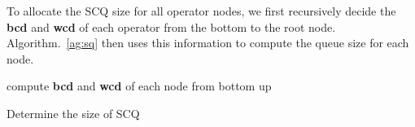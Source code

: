 To allocate the SCQ size for all operator nodes, we first recursively decide the \textbf{bcd} and \textbf{wcd} of each operator from the bottom to the root node. Algorithm.~\ref{ag:sq} then uses this information to compute the queue size for each node.\par


\begin{algorithm}
    \SetAlgoLined
    
    compute \textbf{bcd} and \textbf{wcd} of each node from bottom up\;
    
    
     \caption{\label{ag:sq}Determine the size of SCQ}
\end{algorithm}


